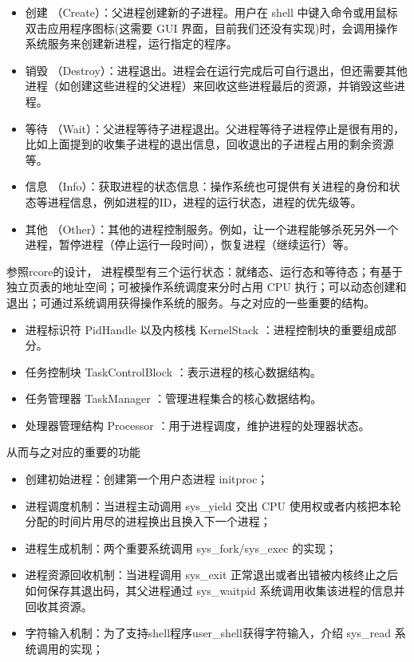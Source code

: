 \begin{itemize}
\item 创建 （Create）：父进程创建新的子进程。用户在 shell 中键入命令或用鼠标双击应用程序图标(这需要 GUI 界面，目前我们还没有实现)时，会调用操作系统服务来创建新进程，运行指定的程序。
\item 销毁 （Destroy）：进程退出。进程会在运行完成后可自行退出，但还需要其他进程（如创建这些进程的父进程）来回收这些进程最后的资源，并销毁这些进程。
\item 等待 （Wait）：父进程等待子进程退出。父进程等待子进程停止是很有用的，比如上面提到的收集子进程的退出信息，回收退出的子进程占用的剩余资源等。
\item 信息 （Info）：获取进程的状态信息：操作系统也可提供有关进程的身份和状态等进程信息，例如进程的ID，进程的运行状态，进程的优先级等。
\item 其他 （Other）：其他的进程控制服务。例如，让一个进程能够杀死另外一个进程，暂停进程（停止运行一段时间），恢复进程（继续运行）等。
\end{itemize}

参照rcore的设计， 进程模型有三个运行状态：就绪态、运行态和等待态；有基于独立页表的地址空间；可被操作系统调度来分时占用 CPU 执行；可以动态创建和退出；可通过系统调用获得操作系统的服务。与之对应的一些重要的结构。

\begin{itemize}
\item 进程标识符 PidHandle 以及内核栈 KernelStack ：进程控制块的重要组成部分。
\item 任务控制块 TaskControlBlock ：表示进程的核心数据结构。
\item 任务管理器 TaskManager ：管理进程集合的核心数据结构。
\item 处理器管理结构 Processor ：用于进程调度，维护进程的处理器状态。
\end{itemize}

从而与之对应的重要的功能

\begin{itemize}
\item 创建初始进程：创建第一个用户态进程 initproc；
\item 进程调度机制：当进程主动调用 sys\_yield 交出 CPU 使用权或者内核把本轮分配的时间片用尽的进程换出且换入下一个进程；
\item 进程生成机制：两个重要系统调用 sys\_fork/sys\_exec 的实现；
\item 进程资源回收机制：当进程调用 sys\_exit 正常退出或者出错被内核终止之后如何保存其退出码，其父进程通过 sys\_waitpid 系统调用收集该进程的信息并回收其资源。
\item 字符输入机制：为了支持shell程序user\_shell获得字符输入，介绍 sys\_read 系统调用的实现；
\end{itemize}

